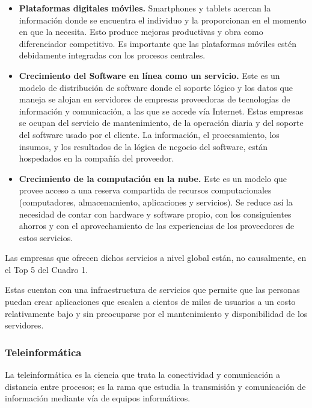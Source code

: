 \documentclass[a4paper, 12pt]{article}
\begin{document}
\begin{itemize}
\item \textbf{Plataformas digitales móviles.} Smartphones y tablets acercan la información donde se encuentra el individuo y la proporcionan en el momento en que la necesita. Esto produce mejoras productivas y obra como diferenciador competitivo. Es importante que las plataformas móviles estén debidamente integradas con los procesos centrales.

\item \textbf{Crecimiento del Software en línea como un servicio.}
Este es un modelo de distribución de software donde el soporte lógico y los datos que maneja se alojan en servidores de empresas proveedoras de tecnologías de información y comunicación, a las que se accede vía Internet. Estas empresas se ocupan del servicio de mantenimiento, de la operación diaria y del soporte del software usado por el cliente. La información, el procesamiento, los insumos, y los resultados de la lógica de negocio del software, están hospedados en la compañía del proveedor.

\item \textbf{Crecimiento de la computación en la nube.}
Este es un modelo que provee acceso a una reserva compartida de recursos computacionales (computadores, almacenamiento, aplicaciones y servicios). 
Se reduce así la necesidad de contar con hardware y software propio, con los consiguientes ahorros y con el aprovechamiento de las experiencias de los proveedores de estos servicios.

\end{itemize}

Las empresas que ofrecen dichos servicios a nivel global están, no causalmente, en el Top 5 del Cuadro 1.

Estas  cuentan con una infraestructura de servicios que permite que las personas puedan crear aplicaciones que escalen a cientos de miles de usuarios a un costo relativamente bajo y sin preocuparse por el mantenimiento y disponibilidad de los servidores.

\subsubsection{Teleinformática}
\label{TeleInformatica}


La teleinformática es la ciencia que trata la conectividad y comunicación a distancia entre procesos; es la rama que estudia la transmisión y comunicación de información mediante vía de equipos informáticos.
\end{document}
